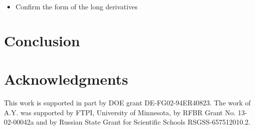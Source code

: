 \documentclass[epsfig,12pt]{article}
\begin{document}
\begin{itemize}
\item
	Confirm the form of the long derivatives
\end{itemize}

\section{Conclusion}


\section*{Acknowledgments}

	This work  is supported in part by DOE grant DE-FG02-94ER40823. 
	The work of A.Y. was  supported 
	by  FTPI, University of Minnesota, 
	by RFBR Grant No. 13-02-00042a 
	and by Russian State Grant for 
	Scientific Schools RSGSS-657512010.2.
\end{document}
